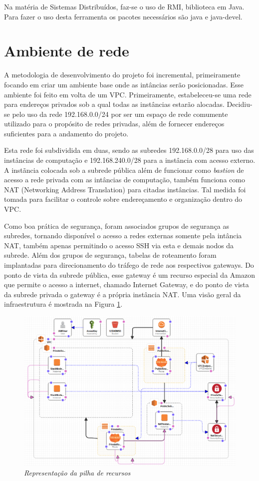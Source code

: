 \documentclass[tg]{mdtufsm}
\begin{document}
Na matéria de Sistemas Distribuídos, faz-se o uso de RMI, biblioteca em Java. Para fazer o uso desta ferramenta os pacotes necessários são java e java-devel.

\section{Ambiente de rede}

A metodologia de desenvolvimento do projeto foi incremental, primeiramente focando em criar um ambiente base onde as intâncias serão posicionadas. Esse ambiente foi feito em volta de um VPC. Primeiramente, estabeleceu-se uma rede para endereços privados sob a qual todas as instâncias estarão alocadas. Decidiu-se pelo uso da rede 192.168.0.0/24 por ser um espaço de rede comumente utilizado para o propósito de redes privadas, além de fornecer endereços suficientes para a andamento do projeto.

Esta rede foi subdividida em duas, sendo as subredes 192.168.0.0/28 para uso das instâncias de computação e 192.168.240.0/28 para a instância com acesso externo. A instãncia colocada sob a subrede pública além de funcionar como \emph{bastion} de acesso a rede privada com as intâncias de computação, também funciona como NAT (Networking Address Translation) para citadas instâncias. Tal medida foi tomada para facilitar o controle sobre endereçamento e organização dentro do VPC.

Como boa prática de segurança, foram associados grupos de segurança as subredes, tornando disponível o acesso a redes externas somente pela intância NAT, também apenas permitindo o acesso SSH via esta e demais nodos da subrede. Além dos grupos de segurança, tabelas de roteamento foram implantadas para direcionamento do tráfego de rede aos respectivos gateways. Do ponto de vista da subrede pública, esse gateway é um recurso especial da Amazon que permite o acesso a internet, chamado Internet Gateway, e do ponto de vista da subrede privada o gateway é a própria instância NAT. Uma visão geral da infraestrutura é mostrada na Figura \ref{fig:myInfra}.

\begin{figure}
	\centering
	\includegraphics[width=1\textwidth]{myInfra}
	\caption{\emph{Representação da pilha de recursos}}
	\label{fig:myInfra}
\end{figure}
\end{document}
